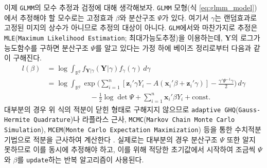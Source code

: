 \documentclass[11pt,onecolumn,twoside,a4size]{gsag3jnl}
\begin{document}
이제 \texttt{GLMM}의 모수 추정과 검정에 대해 생각해보자. \texttt{GLMM} 모형(식 \ref{eq:glmm_model})에서 추정해야 할 모수로는 고정효과 $\beta$와 분산구조 $\Psi$가 있다. 여기서 $\gamma$는 랜덤효과로 고정된 미지의 상수가 아니므로 추정의 대상이 아니다. \texttt{GLM}에서와 마찬가지로 추정은 \texttt{MLE}(\texttt{Maximum Likelihood Estimation}; 최대가능도추정)을 이용하는데, $\mathbf{Y}$의 로그가능도함수를 구하면 분산구조 $\Psi$를 알고 있다는 가정 하에 베이즈 정리로부터 다음과 같이 구해진다.
\begin{align}
  l(\beta)&=\log\int_{\mathbb{R}^q}f_{\mathbf{Y}\vert\gamma}(\mathbf{Y}\vert\gamma)f_\gamma(\gamma)\,d\gamma\\
  &=\log\int_{\mathbb{R}^q}\exp\bigg(\sum_{i=1}^n[\mathbf{z}_i'\gamma Y_i-A(\mathbf{x}_i'\beta+\mathbf{z}_i'\gamma)]-\frac{\gamma'\Psi^{-1}\gamma}{2}\bigg)\,d\gamma\nonumber\\
  &\qquad\qquad\qquad-\frac{1}{2}\log\det\Psi+\sum_{i=1}^n\mathbf{x}_i'\beta Y_i+\mathrm{const.}\nonumber
\end{align}
대부분의 경우 위 식의 적분이 닫힌 형태로 구해지지 않으므로 \texttt{adaptive GHQ}(\texttt{Gauss-Hermite Quadrature})나 라플라스 근사, \texttt{MCMC}(\texttt{Markov Chain Monte Carlo Simulation}), \texttt{MCEM}(\texttt{Monte Carlo Expectation Maximization}) 등을 통한 수치적분 기법으로 적분을 근사하여 계산한다 \texttt{\citep{capanu2013assessment}}. 실제로는 대부분의 경우 분산구조 $\Psi$ 또한 알지 못하므로 이를 동시에 추정해야 하고, 이를 위해 적당한 초기값에서 시작하여 조금씩 $\Psi$와 $\beta$를 \texttt{update}하는 반복 알고리즘이 사용된다.
\end{document}
